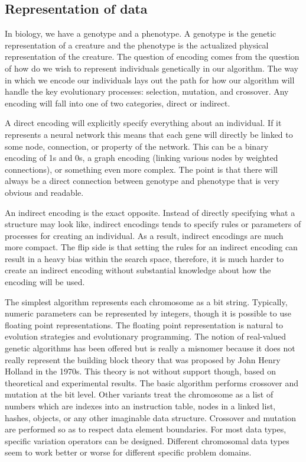 \subsection{Representation of data}
In biology, we have a genotype and a phenotype.
A genotype is the genetic representation of a creature and the phenotype is the actualized physical
representation of the creature. 
The question of encoding comes from the question of how do we wish to represent individuals 
genetically in our algorithm.
The way in which we encode our individuals lays out the path for how our algorithm will handle 
the key evolutionary processes: selection, mutation, and crossover.
Any encoding will fall into one of two categories, direct or indirect.

A direct encoding will explicitly specify everything about an individual.
If it represents a neural network this means that each gene will directly be linked to some node,
connection, or property of the network.
This can be a binary encoding of 1s and 0s, a graph encoding (linking various nodes by weighted
connections), or something even more complex.
The point is that there will always be a direct connection between genotype and phenotype that
is very obvious and readable.

An indirect encoding is the exact opposite. Instead of directly specifying what a structure may
look like, indirect encodings tends to specify rules or parameters of processes for creating an
individual.
As a result, indirect encodings are much more compact. The flip side is that setting the rules for
an indirect encoding can result in a heavy bias within the search space, therefore, it is much
harder to create an indirect encoding without substantial knowledge about how the 
encoding will be used.

The simplest algorithm represents each chromosome as a bit string.
Typically, numeric parameters can be represented by integers, though it is possible to use floating
point representations.
The floating point representation is natural to evolution strategies and evolutionary programming.
The notion of real-valued genetic algorithms has been offered but is really a misnomer because it
does not really represent the building block theory that was proposed by John Henry Holland in
the 1970s.
This theory is not without support though, based on theoretical and experimental results.
The basic algorithm performs crossover and mutation at the bit level. 
Other variants treat the chromosome as a list of numbers which are indexes into an instruction
table, nodes in a linked list, hashes, objects, or any other imaginable data structure. 
Crossover and mutation are performed so as to respect data element boundaries.
For most data types, specific variation operators can be designed. Different chromosomal data types
seem to work better or worse for different specific problem domains.

